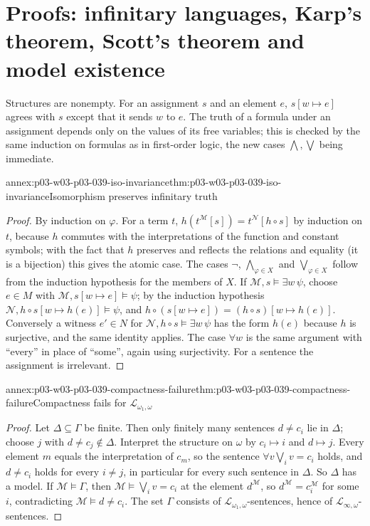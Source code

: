 \section{Proofs: infinitary languages, Karp's theorem, Scott's theorem and model existence}
\label{sec:annex-p03-w03-p03-039-marker}

Structures are nonempty. For an assignment \(s\) and an element \(e\),
\(s[w\mapsto e]\) agrees with \(s\) except that it sends \(w\) to \(e\). The
truth of a formula under an assignment depends only on the values of its
free variables; this is checked by the same induction on formulas as in
first-order logic, the new cases \(\bigwedge,\bigvee\) being immediate.

\begin{annexitem}{annex:p03-w03-p03-039-iso-invariance}{thm:p03-w03-p03-039-iso-invariance}{Isomorphism preserves infinitary truth}
\begin{proof}
By induction on \(\varphi\). For a term \(t\), \(h(t^{\mathcal M}[s])=t^{\mathcal N}[h\circ s]\)
by induction on \(t\), because \(h\) commutes with the interpretations of
the function and constant symbols; with the fact that \(h\) preserves and
reflects the relations and equality (it is a bijection) this gives the
atomic case. The cases \(\neg\), \(\bigwedge_{\varphi\in X}\) and
\(\bigvee_{\varphi\in X}\) follow from the induction hypothesis for the
members of \(X\). If \(\mathcal M,s\models\exists w\,\psi\), choose \(e\in M\)
with \(\mathcal M,s[w\mapsto e]\models\psi\); by the induction hypothesis
\(\mathcal N,h\circ s[w\mapsto h(e)]\models\psi\), and
\(h\circ(s[w\mapsto e])=(h\circ s)[w\mapsto h(e)]\). Conversely a witness
\(e'\in N\) for \(\mathcal N,h\circ s\models\exists w\,\psi\) has the form
\(h(e)\) because \(h\) is surjective, and the same identity applies. The
case \(\forall w\) is the same argument with ``every'' in place of ``some'',
again using surjectivity. For a sentence the assignment is irrelevant.
\end{proof}
\end{annexitem}

\begin{annexitem}{annex:p03-w03-p03-039-compactness-failure}{thm:p03-w03-p03-039-compactness-failure}{Compactness fails for \(\mathcal L_{\omega_1,\omega}\)}
\begin{proof}
Let \(\Delta\subseteq\Gamma\) be finite. Then only finitely many sentences
\(d\ne c_i\) lie in \(\Delta\); choose \(j\) with \(d\ne c_j\notin\Delta\).
Interpret the structure on \(\omega\) by \(c_i\mapsto i\) and \(d\mapsto j\).
Every element \(m\) equals the interpretation of \(c_m\), so the sentence
\(\forall v\bigvee_iv=c_i\) holds, and \(d\ne c_i\) holds for every
\(i\ne j\), in particular for every such sentence in \(\Delta\). So
\(\Delta\) has a model. If \(\mathcal M\models\Gamma\), then
\(\mathcal M\models\bigvee_iv=c_i\) at the element \(d^{\mathcal M}\), so
\(d^{\mathcal M}=c_i^{\mathcal M}\) for some \(i\), contradicting
\(\mathcal M\models d\ne c_i\). The set \(\Gamma\) consists of
\(\mathcal L_{\omega_1,\omega}\)-sentences, hence of
\(\mathcal L_{\infty,\omega}\)-sentences.
\end{proof}
\end{annexitem}

